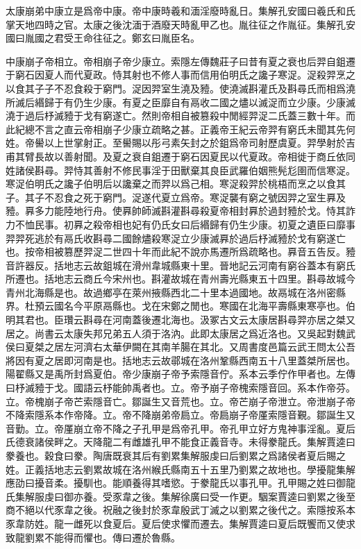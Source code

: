 太康崩弟中康立是爲帝中康。帝中康時羲和湎淫廢時亂日。集解孔安國曰羲氏和氏掌天地四時之官。太康之後沈湎于酒廢天時亂甲乙也。胤往征之作胤征。集解孔安國曰胤國之君受王命往征之。鄭玄曰胤臣名。

中康崩子帝相立。帝相崩子帝少康立。索隱左傳魏莊子曰昔有夏之衰也后羿自鉏遷于窮石因夏人而代夏政。恃其射也不修人事而信用伯明氏之讒子寒浞。浞殺羿烹之以食其子子不忍食殺于窮門。浞因羿室生澆及豷。使澆滅斟灌氏及斟尋氏而相爲澆所滅后緡歸于有仍生少康。有夏之臣靡自有鬲收二國之燼以滅浞而立少康。少康滅澆于過后杼滅豷于戈有窮遂亡。然則帝相自被篡殺中閒經羿浞二氏蓋三數十年。而此紀總不言之直云帝相崩子少康立疏略之甚。正義帝王紀云帝羿有窮氏未聞其先何姓。帝嚳以上世掌射正。至嚳賜以彤弓素矢封之於鉏爲帝司射歷虞夏。羿學射於吉甫其臂長故以善射聞。及夏之衰自鉏遷于窮石因夏民以代夏政。帝相徙于商丘依同姓諸侯斟尋。羿恃其善射不修民事淫于田獸棄其良臣武羅伯姻熊髡尨圉而信寒浞。寒浞伯明氏之讒子伯明后以讒棄之而羿以爲己相。寒浞殺羿於桃梧而烹之以食其子。其子不忍食之死于窮門。浞遂代夏立爲帝。寒浞襲有窮之號因羿之室生奡及豷。奡多力能陸地行舟。使奡帥師滅斟灌斟尋殺夏帝相封奡於過封豷於戈。恃其詐力不恤民事。初奡之殺帝相也妃有仍氏女曰后緡歸有仍生少康。初夏之遺臣曰靡事羿羿死逃於有鬲氏收斟尋二國餘燼殺寒浞立少康滅奡於過后杼滅豷於戈有窮遂亡也。按帝相被篡歷羿浞二世四十年而此紀不說亦馬遷所爲疏略也。奡音五告反。豷音許器反。括地志云故鉏城在滑州韋城縣東十里。晉地記云河南有窮谷蓋本有窮氏所遷也。括地志云商丘今宋州也。斟灌故城在青州壽光縣東五十四里。斟尋故城今青州北海縣是也。故過鄉亭在萊州掖縣西北二十里本過國地。故鬲城在洛州密縣界。杜預云國名今平原鬲縣也。戈在宋鄭之閒也。寒國在北海平壽縣東寒亭也。伯明其君也。臣瓚云斟尋在河南蓋後遷北海也。汲冢古文云太康居斟尋羿亦居之桀又居之。尚書云太康失邦兄弟五人須于洛汭。此即太康居之爲近洛也。又吳起對魏武侯曰夏桀之居左河濟右太華伊闕在其南羊腸在其北。又周書度邑篇云武王問太公吾將因有夏之居即河南是也。括地志云故鄩城在洛州鞏縣西南五十八里蓋桀所居也。陽翟縣又是禹所封爲夏伯。帝少康崩子帝予索隱音佇。系本云季佇作甲者也。左傳曰杼滅豷于戈。國語云杼能帥禹者也。立。帝予崩子帝槐索隱音回。系本作帝芬。立。帝槐崩子帝芒索隱音亡。鄒誕生又音荒也。立。帝芒崩子帝泄立。帝泄崩子帝不降索隱系本作帝降。立。帝不降崩弟帝扃立。帝扃崩子帝厪索隱音覲。鄒誕生又音勤。立。帝厪崩立帝不降之子孔甲是爲帝孔甲。帝孔甲立好方鬼神事淫亂。夏后氏德衰諸侯畔之。天降龍二有雌雄孔甲不能食正義音寺。未得豢龍氏。集解賈逵曰豢養也。穀食曰豢。陶唐既衰其后有劉累集解服虔曰后劉累之爲諸侯者夏后賜之姓。正義括地志云劉累故城在洛州緱氏縣南五十五里乃劉累之故地也。學擾龍集解應劭曰擾音柔。擾馴也。能順養得其嗜慾。于豢龍氏以事孔甲。孔甲賜之姓曰御龍氏集解服虔曰御亦養。受豕韋之後。集解徐廣曰受一作更。駰案賈逵曰劉累之後至商不絕以代豕韋之後。祝融之後封於豕韋殷武丁滅之以劉累之後代之。索隱按系本豕韋防姓。龍一雌死以食夏后。夏后使求懼而遷去。集解賈逵曰夏后既饗而又使求致龍劉累不能得而懼也。傳曰遷於魯縣。

